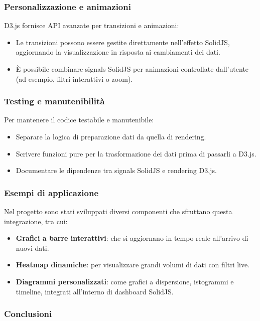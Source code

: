 \subsubsection{Personalizzazione e animazioni}

D3.js fornisce API avanzate per transizioni e animazioni:
\begin{itemize}
    \item Le transizioni possono essere gestite direttamente nell’effetto SolidJS, aggiornando la visualizzazione in risposta ai cambiamenti dei dati.
    \item È possibile combinare signals SolidJS per animazioni controllate dall’utente (ad esempio, filtri interattivi o zoom).
\end{itemize}

\subsubsection{Testing e manutenibilità}

Per mantenere il codice testabile e manutenibile:
\begin{itemize}
    \item Separare la logica di preparazione dati da quella di rendering.
    \item Scrivere funzioni pure per la trasformazione dei dati prima di passarli a D3.js.
    \item Documentare le dipendenze tra signals SolidJS e rendering D3.js.
\end{itemize}

\subsubsection{Esempi di applicazione}

Nel progetto sono stati sviluppati diversi componenti che sfruttano questa integrazione, tra cui:
\begin{itemize}
    \item \textbf{Grafici a barre interattivi}: che si aggiornano in tempo reale all’arrivo di nuovi dati.
    \item \textbf{Heatmap dinamiche}: per visualizzare grandi volumi di dati con filtri live.
    \item \textbf{Diagrammi personalizzati}: come grafici a dispersione, istogrammi e timeline, integrati all’interno di dashboard SolidJS.
\end{itemize}

\subsubsection{Conclusioni}

